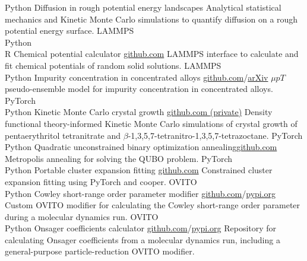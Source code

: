 \documentclass[9pt]{developercv} %
\begin{document}
\begin{entrylist}
    \entry
        {Python}
        {Diffusion in rough potential energy landscapes}
        {}
        {Analytical statistical mechanics and Kinetic Monte Carlo simulations to quantify diffusion on a rough potential energy surface.}
    \entry
        {LAMMPS \\ Python \\ R}
        {Chemical potential calculator}
        {\href{https://github.com/jwjeffr/chemical_potential_bulk}{github.com}}
        {LAMMPS interface to calculate and fit chemical potentials of random solid solutions.}
    \entry
		{LAMMPS \\ Python}
		{Impurity concentration in concentrated alloys}
        {\href{https://github.com/jwjeffr/vacancy_concentration}{github.com}/\href{https://arxiv.org/abs/2402.07324}{arXiv}}
		{$\mu pT$ pseudo-ensemble model for impurity concentration in concentrated alloys.}
    \entry
        {PyTorch \\ Python}
		{Kinetic Monte Carlo crystal growth}
        {\href{https://github.com/jwjeffr/torch-cgkmc}{github.com {\color{gray} (private)}}}
		{Density functional theory-informed Kinetic Monte Carlo simulations of crystal growth of pentaerythritol tetranitrate and $\beta$-1,3,5,7-tetranitro-1,3,5,7-tetrazoctane.}
    \entry
		{PyTorch \\ Python}
		{Quadratic unconstrained binary optimization annealing}{\href{https://github.com/jwjeffr/pytorch_annealing}{github.com}}
		{Metropolis annealing for solving the QUBO problem.}
    \entry
		{PyTorch \\ Python}
		{Portable cluster expansion fitting}
		{\href{https://github.com/jwjeffr/cluster_expansion_pytorch}{github.com}}
		{Constrained cluster expansion fitting using PyTorch and cooper.}
    \entry
		{OVITO \\ Python}
		{Cowley short-range order parameter modifier}
		{\href{https://github.com/jwjeffr/cowley_sro_parameters}{github.com}/\href{https://pypi.org/project/cowley-sro-parameters/}{pypi.org}}
		{Custom OVITO modifier for calculating the Cowley short-range order parameter during a molecular dynamics run.}
    \entry
		{OVITO \\ Python}
		{Onsager coefficients calculator}
		{\href{https://github.com/jwjeffr/onsager_coefficients/}{github.com}/\href{https://pypi.org/project/onsager-coefficients/}{pypi.org}}
		{Repository for calculating Onsager coefficients from a molecular dynamics run, including a general-purpose particle-reduction OVITO modifier.}
\end{entrylist}
\end{document}
